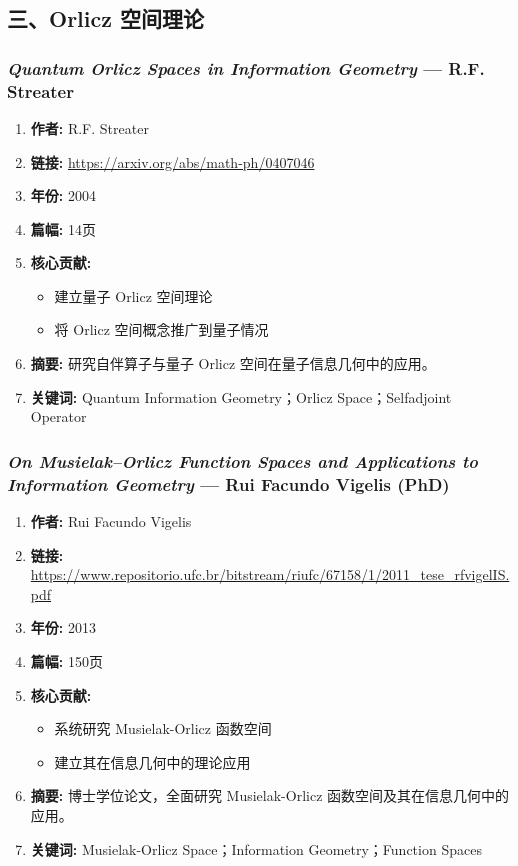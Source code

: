 \subsection{三、Orlicz 空间理论}

\subsubsection{\textbf{\textit{Quantum Orlicz Spaces in Information Geometry}} — R.F. Streater}
\begin{enumerate}
    \item \textbf{作者:} R.F. Streater
    \item \textbf{链接:} \url{https://arxiv.org/abs/math-ph/0407046}
    \item \textbf{年份:} 2004
    \item \textbf{篇幅:} 14页
    \item \textbf{核心贡献:}
        \begin{itemize}
            \item 建立量子 Orlicz 空间理论
            \item 将 Orlicz 空间概念推广到量子情况
        \end{itemize}
    \item \textbf{摘要:} 研究自伴算子与量子 Orlicz 空间在量子信息几何中的应用。
    \item \textbf{关键词:} Quantum Information Geometry；Orlicz Space；Selfadjoint Operator
\end{enumerate}

\subsubsection{\textbf{\textit{On Musielak–Orlicz Function Spaces and Applications to Information Geometry}} — Rui Facundo Vigelis (PhD)}
\begin{enumerate}
    \item \textbf{作者:} Rui Facundo Vigelis
    \item \textbf{链接:} \url{https://www.repositorio.ufc.br/bitstream/riufc/67158/1/2011_tese_rfvigelIS.pdf}
    \item \textbf{年份:} 2013
    \item \textbf{篇幅:} 150页
    \item \textbf{核心贡献:}
        \begin{itemize}
            \item 系统研究 Musielak-Orlicz 函数空间
            \item 建立其在信息几何中的理论应用
        \end{itemize}
    \item \textbf{摘要:} 博士学位论文，全面研究 Musielak-Orlicz 函数空间及其在信息几何中的应用。
    \item \textbf{关键词:} Musielak-Orlicz Space；Information Geometry；Function Spaces
\end{enumerate}

